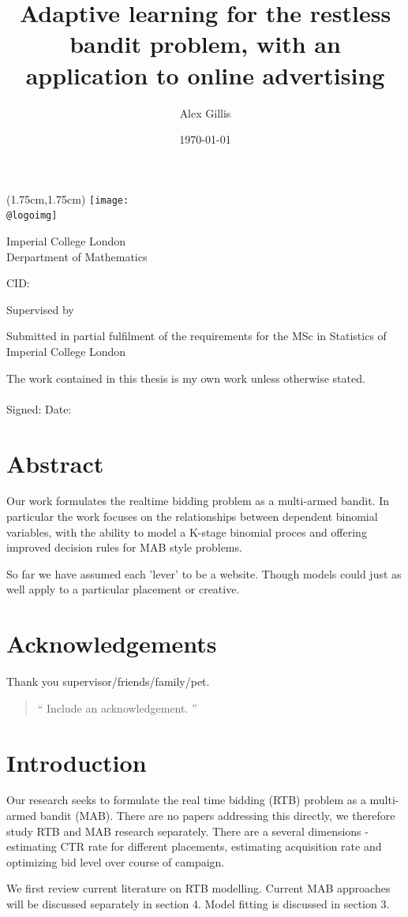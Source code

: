 \documentclass[11pt,a4,singlespacing,titlepagenumber=on]{scrreprt}
\title{Adaptive learning for the restless bandit problem, with an application to online advertising}
\author{Alex Gillis}
\date{\today}
\makeatletter
\numberwithin{equation}{chapter} %
\theoremstyle{remark}
\renewcommand{\maketitle}{
\begin{titlepage}
\ifdefined\@logoimg
\begin{textblock*}{8cm}(1.75cm,1.75cm)
\texttt{[image: \\@logoimg]}
\end{textblock*}
\vspace*{1cm}
\else
\fi
\begin{center}
\vspace*{\stretch{0.1}}
Imperial College London\\
Derpartment of Mathematics\par
\vspace*{\stretch{1}} %
{\titlefont\Huge \@title\par} %
\vspace*{\stretch{2}}
{\Large \@author \par}
\vspace*{1em}
{\large CID: \@CID \par}
\vspace*{\stretch{0.5}}
{\large Supervised by \@supervisor \par}
\vspace*{\stretch{3}}
{\Large \@date \par}
\vspace*{\stretch{1}}
{\large Submitted in partial fulfilment of the requirements for the
MSc in Statistics of Imperial College London}
\vspace*{\stretch{0.1}}
\end{center}%
\end{titlepage}%
}
\newcommand*{\declaration}{%
\vspace*{0.3\textheight}
The work contained in this thesis is my own work unless
otherwise stated.\\
\vspace*{0.1\textheight}\\
\hspace*{0.25\textwidth}Signed: \hspace{0.25\textwidth} Date:
\clearpage}
\renewenvironment{abstract}%
{\chapter*{Abstract}\thispagestyle{plain}}%
{\clearpage}
\newenvironment{myquote}%
{\begin{quote}{\Large{}``}}%
{{\Large{}''}\end{quote}}
\makeatother
\begin{document}
\maketitle %

\declaration %

\begin{abstract}

Our work formulates the realtime bidding problem as a multi-armed bandit. In particular the work focuses on the relationships between dependent binomial variables, with the ability to model a K-stage binomial proces and offering improved decision rules for MAB style problems.

So far we have assumed each 'lever' to be a website. Though models could just as well apply to a particular placement or creative.

\end{abstract}

\newpage
\chapter*{Acknowledgements}
Thank you supervisor/friends/family/pet.
\begin{myquote}
Include an acknowledgement.
\end{myquote}
\newpage

\renewcommand{\contentsname}{Table of Contents}
\tableofcontents
\newpage




\chapter{Introduction}

Our research seeks to formulate the real time bidding (RTB) problem as a multi-armed bandit (MAB). There are no papers addressing this directly, we therefore study RTB and MAB research separately. There are a several dimensions - estimating CTR rate for different placements, estimating acquisition rate and optimizing bid level over course of campaign.

We first review current literature on RTB modelling. Current MAB approaches will be discussed separately in section 4. Model fitting is discussed in section 3.
\end{document}
